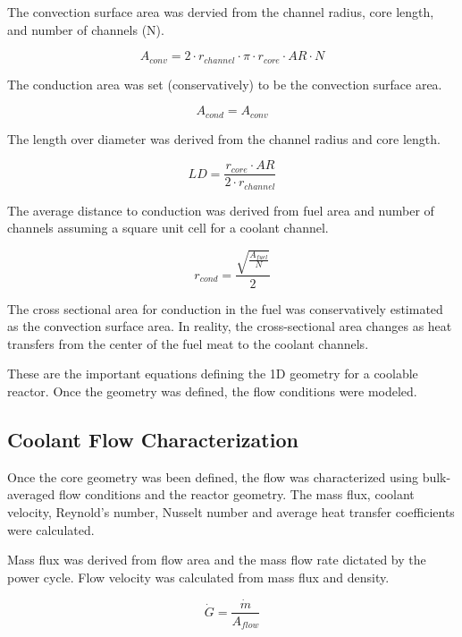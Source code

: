 The convection surface area was dervied from the channel radius, core length, and
number of channels (N).

\begin{equation}
    A_{conv} = 2\cdot r_{channel}\cdot \pi\cdot r_{core}\cdot AR\cdot N
\end{equation}

The conduction area was set (conservatively) to be the convection surface area.

\begin{equation}
    A_{cond} = A_{conv}
\end{equation}


The length over diameter was derived from the channel radius and core length.

\begin{equation}
    LD = \frac{r_{core}\cdot AR}{2\cdot r_{channel}}
\end{equation}

The average distance to conduction was derived from fuel area and number of
channels assuming a square unit cell for a coolant channel.

\begin{equation}
    r_{cond} = \frac{\sqrt{\frac{A_{fuel}}{N}}}{2}
    \label{r_cond}
\end{equation}

The cross sectional area for conduction in the fuel was conservatively estimated
as the convection surface area. In reality, the cross-sectional area changes as
heat transfers from the center of the fuel meat to the coolant channels.

These are the important equations defining the 1D geometry for a coolable
reactor. Once the geometry was defined, the flow conditions were modeled.

\subsection{Coolant Flow Characterization}

Once the core geometry was been defined, the flow was characterized using
bulk-averaged flow conditions and the reactor geometry. The mass flux, coolant
velocity, Reynold's number, Nusselt number and average heat transfer
coefficients were calculated.

Mass flux was derived from flow area and the mass flow rate dictated by the power
cycle. Flow velocity was calculated from mass flux and density.

\begin{equation}
    \dot{G} = \frac{\dot{m}}{A_{flow}}
\end{equation}

